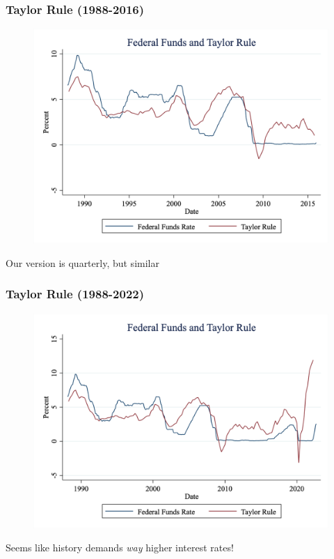 \documentclass{beamer}
\begin{document}
\begin{frame}
\frametitle[alignment=center]{Taylor Rule (1988-2016)}
\begin{figure}
\centering
\includegraphics[scale=0.25]{Figures/FedFunds1.png}
\end{figure}
Our version is quarterly, but similar
\end{frame}

\begin{frame}
\frametitle[alignment=center]{Taylor Rule (1988-2022)}
\begin{figure}
\centering
\includegraphics[scale=0.25]{Figures/FedFunds2.png}
\end{figure}
Seems like history demands \emph{way} higher interest rates!
\end{frame}
\end{document}

